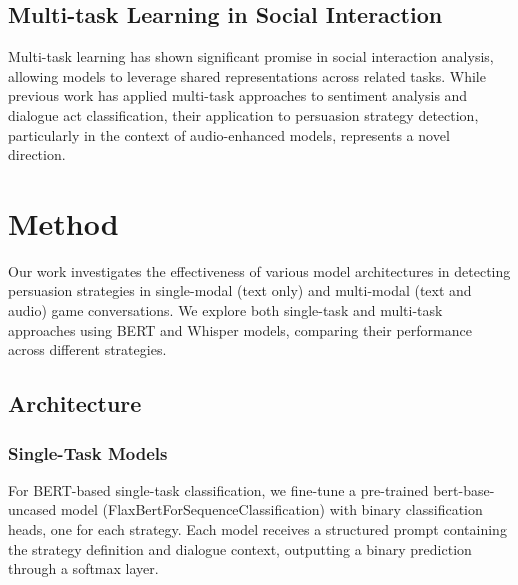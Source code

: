 \documentclass[10pt,twocolumn]{article}
\begin{document}
\subsection{Multi-task Learning in Social Interaction}
Multi-task learning has shown significant promise in social interaction analysis, allowing models to leverage shared representations across related tasks. While previous work has applied multi-task approaches to sentiment analysis and dialogue act classification, their application to persuasion strategy detection, particularly in the context of audio-enhanced models, represents a novel direction.

\section{Method}
Our work investigates the effectiveness of various model architectures in detecting persuasion strategies in single-modal (text only) and  multi-modal (text and audio) game conversations. We explore both single-task and multi-task approaches using BERT and Whisper models, comparing their performance across different strategies.

\subsection{Architecture}

\subsubsection{Single-Task Models}
For BERT-based single-task classification, we fine-tune a pre-trained bert-base-uncased model (FlaxBertForSequenceClassification) with binary classification heads, one for each strategy. Each model receives a structured prompt containing the strategy definition and dialogue context, outputting a binary prediction through a softmax layer.
\end{document}
